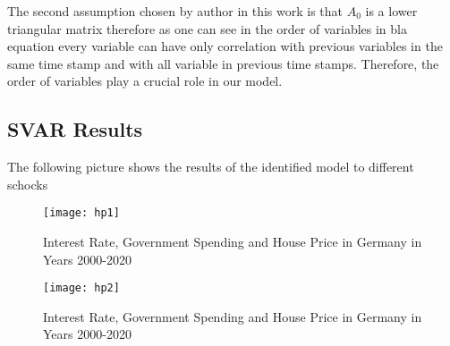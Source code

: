 The second assumption chosen by author in this work is that $A_0$ is a lower triangular matrix therefore as one can see in the order of variables in bla equation every variable can have only correlation with previous variables in the same time stamp and with all variable in previous time stamps. Therefore, the order of variables play a crucial role in our model. 


\subsection{SVAR Results}
The following picture shows the results of the identified model to different schocks
\begin{figure}[H]
\caption{Interest Rate, Government Spending and House Price in Germany in Years 2000-2020}
\texttt{[image: hp1]}
\\
\cite[Quelle: Own Graph][]{FOM}
\end{figure}
\begin{figure}[H]
\caption{Interest Rate, Government Spending and House Price in Germany in Years 2000-2020}
\texttt{[image: hp2]}
\\
\cite[Quelle: Own Graph][]{FOM}
\end{figure}


